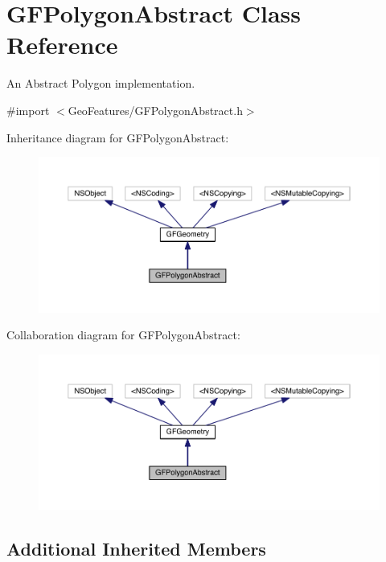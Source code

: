 \hypertarget{interface_g_f_polygon_abstract}{}\section{G\+F\+Polygon\+Abstract Class Reference}
\label{interface_g_f_polygon_abstract}


An Abstract Polygon implementation.  




{\ttfamily \#import $<$Geo\+Features/\+G\+F\+Polygon\+Abstract.\+h$>$}



Inheritance diagram for G\+F\+Polygon\+Abstract\+:\nopagebreak
\begin{figure}[H]
\begin{center}
\leavevmode
\includegraphics[width=350pt]{interface_g_f_polygon_abstract__inherit__graph}
\end{center}
\end{figure}


Collaboration diagram for G\+F\+Polygon\+Abstract\+:\nopagebreak
\begin{figure}[H]
\begin{center}
\leavevmode
\includegraphics[width=350pt]{interface_g_f_polygon_abstract__coll__graph}
\end{center}
\end{figure}
\subsection*{Additional Inherited Members}


